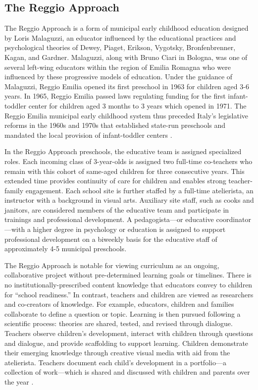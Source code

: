 \subsection{The Reggio Approach}

The Reggio Approach is a form of municipal early childhood education designed by Loris Malaguzzi, an educator influenced by the educational practices and psychological theories of Dewey, Piaget, Erikson, Vygotsky, Bronfenbrenner, Kagan, and Gardner. Malaguzzi, along with Bruno Ciari in Bologna, was one of several left-wing educators within the region of Emilia Romagna who were influenced by these progressive models of education. Under the guidance of Malaguzzi, Reggio Emilia opened its first preschool in 1963 for children aged 3-6 years. In 1965, Reggio Emilia passed laws regulating funding for the first infant-toddler center for children aged 3 months to 3 years which opened in 1971. The Reggio Emilia municipal early childhood system thus preceded Italy's legislative reforms in the 1960s and 1970s that established state-run preschools and mandated the local provision of infant-toddler centers \citep{Cagliari-etal-eds_2016_BOOK_Loris-Malaguzzi}. 

In the Reggio Approach preschools, the educative team is assigned specialized roles. Each incoming class of 3-year-olds is assigned two full-time co-teachers who remain with this cohort of same-aged children for three consecutive years. This extended time provides continuity of care for children and enables strong teacher-family engagement. Each school site is further staffed by a full-time atelierista, an instructor with a background in visual arts. Auxiliary site staff, such as cooks and janitors, are considered members of the educative team and participate in trainings and professional development. A pedagogista---or educative coordinator---with a higher degree in psychology or education is assigned to support professional development on a biweekly basis for the educative staff of approximately 4-5 municipal preschools. 

The Reggio Approach is notable for viewing curriculum as an ongoing, collaborative project without pre-determined learning goals or timelines. There is no institutionally-prescribed content knowledge that educators convey to children for ``school readiness.'' In contrast, teachers and children are viewed as researchers and co-creators of knowledge. For example, educators, children and families collaborate to define a question or topic. Learning is then pursued following a scientific process: theories are shared, tested, and revised through dialogue. Teachers observe children's development, interact with children through questions and dialogue, and provide scaffolding to support learning. Children demonstrate their emerging knowledge through creative visual media with aid from the atelierista. Teachers document each child's development in a portfolio---a collection of work---which is shared and discussed with children and parents over the year \citep{Rinaldi_2006_ReggioEmilia_BOOK,Giudici-Nicolosi_2014_Reggio-Approach}. 

